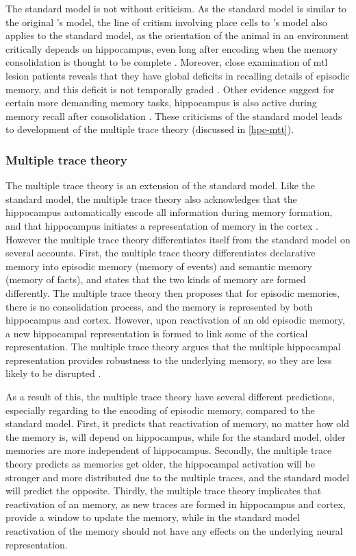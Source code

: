 The standard model is not without criticism. As the standard model is similar to the original \citet{marr71}'s model, the line of critism involving place cells to \citet{marr71}'s model also applies to the standard model, as the orientation of the animal in an environment critically depends on hippocampus, even long after encoding when the memory consolidation is thought to be complete \citet[e.g.][]{mumby99, sutherland01, clark05}. Moreover, close examination of \gls{mtl} lesion patients reveals that they have global deficits in recalling details of episodic memory, and this deficit is not temporally graded \citep{cipolotti01, viskontas02}. Other evidence suggest for certain more demanding memory tasks, hippocampus is also active during memory recall after consolidation \citep{ryan01, wheeler13}. These criticisms of the standard model leads to development of the multiple trace theory (discussed in \ref{hpc-mtt}).

\subsubsection{Multiple trace theory \label{hpc-mtt}}
The multiple trace theory is an extension of the standard model. Like the standard model, the multiple trace theory also acknowledges that the hippocampus automatically encode all information during memory formation, and that hippocampus initiates a representation of memory in the cortex \citep{nadel97}. However the multiple trace theory differentiates itself from the standard model on several accounts. First, the multiple trace theory differentiates declarative memory into episodic memory (memory of events) and semantic memory (memory of facts), and states that the two kinds of memory are formed differently. The multiple trace theory then proposes that for episodic memories, there is no consolidation process, and the memory is represented by both hippocampus and cortex. However, upon reactivation of an old episodic memory, a new hippocampal representation is formed to link some of the cortical representation. The multiple trace theory argues that the multiple hippocampal representation provides robustness to the underlying memory, so they are less likely to be disrupted \citep{nadel97}. 

As a result of this, the multiple trace theory have several different predictions, especially regarding to the encoding of episodic memory, compared to the standard model. First, it predicts that reactivation of memory, no matter how old the memory is, will  depend on hippocampus, while for the standard model, older memories are more independent of hippocampus. Secondly, the multiple trace theory predicts as memories get older, the hippocampal activation will be stronger and more distributed due to the multiple traces, and the standard model will predict the opposite. Thirdly, the multiple trace theory implicates that reactivation of an memory, as new traces are formed in hippocampus and cortex, provide a window to update the memory, while in the standard model reactivation of the memory should not have any effects on the underlying neural representation. 

